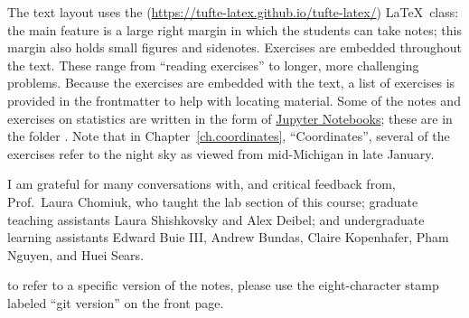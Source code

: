 The text layout uses the  (\url{https://tufte-latex.github.io/tufte-latex/}) \LaTeX\ class:  the main feature is a large right margin in which the students can take notes; this margin also holds small figures and sidenotes. Exercises are embedded throughout the text.  These range from ``reading exercises'' to longer, more challenging problems.  Because the exercises are embedded with the text, a list of exercises is provided in the frontmatter to help with locating material. Some of the notes and exercises on statistics are written in the form of \href{http://jupyter.org}{Jupyter Notebooks}; these are in the folder . Note that in Chapter~\ref{ch.coordinates}, ``Coordinates'', several of the exercises refer to the night sky as viewed from mid-Michigan in late January.

I am grateful for many conversations with, and critical feedback from, Prof.~Laura Chomiuk, who taught the lab section of this course; graduate teaching assistants Laura Shishkovsky and Alex Deibel; and undergraduate learning assistants Edward Buie III, Andrew Bundas, Claire Kopenhafer, Pham Nguyen, and Huei Sears. 

 to refer to a specific version of the notes, please use the eight-character stamp labeled ``git version'' on the front page.
